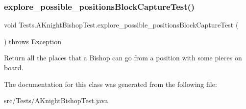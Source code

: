 \subsubsection{\texorpdfstring{explore\+\_\+possible\+\_\+positions\+Block\+Capture\+Test()}{explore\_possible\_positionsBlockCaptureTest()}}
{\footnotesize\ttfamily void Tests.\+A\+Knight\+Bishop\+Test.\+explore\+\_\+possible\+\_\+positions\+Block\+Capture\+Test (\begin{DoxyParamCaption}{ }\end{DoxyParamCaption}) throws Exception\hspace{0.3cm}{\ttfamily [inline]}}

Return all the places that a Bishop can go from a position with some pieces on board. 

The documentation for this class was generated from the following file\+:\begin{DoxyCompactItemize}
\item 
src/\+Tests/A\+Knight\+Bishop\+Test.\+java\end{DoxyCompactItemize}
